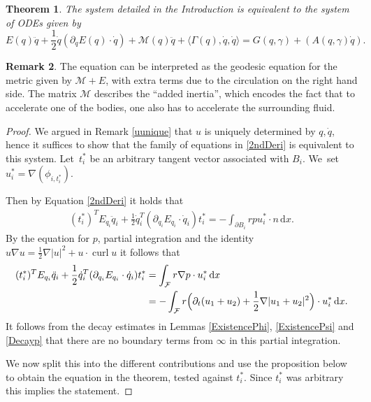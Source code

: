 \documentclass[10pt]{amsart}
\newtheorem{theorem}{Theorem}[subsection]
\theoremstyle{definition}
\newtheorem{remark}[theorem]{Remark}
\DeclareMathOperator{\curl}{curl}
\newcommand\eq{=}
\newcommand\dd{\,\mathrm{d}}
\newcommand\dx{\dd x}
\let\de\partial
\let\mel\relax
\begin{document}
\begin{theorem}\label{ODEtheorem}
The system detailed in the Introduction is equivalent to the system of ODEs given by
\begin{equation}\label{MainODE}
E(q)\ddot{q}+\frac{1}{2}\dot{q}(\de_{q}E(q)\cdot\dot{q})+\mathcal{M}(q)\ddot{q}+\langle\Gamma(q),\dot{q},\dot{q}\rangle
\eq G(q,\gamma)+(A(q,\gamma)\dot{q}).
\end{equation}
\end{theorem}
\begin{remark}
The equation can be interpreted as the geodesic equation for the metric given by $\mathcal{M}+E$, with extra terms due to the circulation on the right hand side. The matrix $\mathcal{M}$ describes the ``added inertia'', which encodes the fact that to accelerate one of the bodies, one also has to accelerate the surrounding fluid.

\end{remark}
\begin{proof}
We argued in Remark \ref{uunique} that $u$ is uniquely determined by $q,\dot{q}$, hence it suffices to show that the family of equations in \eqref{2ndDeri} is equivalent to this system. Let~$t_i^*$ be an arbitrary tangent vector associated with $B_i$. We~set $u_i^*=\nabla(\phi_{i,t_i^*})$.

Then by Equation \ref{2ndDeri} it holds that
\begin{align*}
(t_i^*)^TE_{q_i}\ddot{q}_i+\frac{1}{2}\dot{q}_i^T(\de_{q_i}E_{q_i}\cdot\dot{q}_i)t_i^*\eq -\int_{\de B_i} rpu_i^*\cdot n\dx.
\end{align*}
By the equation for $p$, partial integration and the identity $u\nabla u=\frac{1}{2}\nabla|u|^2+u\cdot \curl u$ it follows that
\begin{align*}
\mel(t_i^*)^TE_{q_i}\ddot{q}_i+\frac{1}{2}\dot{q}_i^T(\de_{q_i}E_{q_i}\cdot\dot{q}_i)t_i^*&\eq\int_{\mathcal{F}}r\nabla p\cdot u_i^*\dx\\
&\eq-\int _{\mathcal{F}}r\Bigl(\de_t(u_1+u_2)+\frac{1}{2}\nabla|u_1+u_2|^2\Bigr)\cdot u_i^*\dx.
\end{align*}
It follows from the decay estimates in Lemmas \ref{ExistencePhi}, \ref{ExistencePsi} and \ref{Decayp} that there are no boundary terms from $\infty$ in this partial integration.

We now split this into the different contributions and use the proposition below to obtain the equation in the theorem, tested against $t_i^*$. Since $t_i^*$ was arbitrary this implies the statement.\end{proof} 
\end{document}

